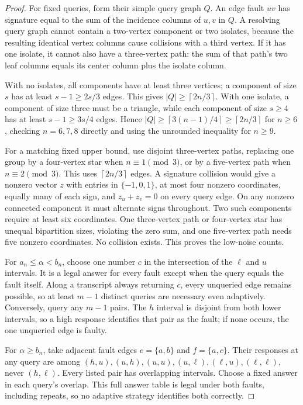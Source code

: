 \documentclass[11pt,letterpaper]{article}
\newcommand{\ceil}[1]{\left\lceil #1\right\rceil}
\begin{document}
\begin{proof}
For fixed queries, form their simple query graph $Q$. An edge fault $uv$ has signature equal to the sum of the incidence columns of $u,v$ in $Q$. A resolving query graph cannot contain a two-vertex component or two isolates, because the resulting identical vertex columns cause collisions with a third vertex. If it has one isolate, it cannot also have a three-vertex path: the sum of that path's two leaf columns equals its center column plus the isolate column.

With no isolates, all components have at least three vertices; a component of size $s$ has at least $s-1\ge2s/3$ edges. This gives $|Q|\ge\ceil{2n/3}$. With one isolate, a component of size three must be a triangle, while each component of size $s\ge4$ has at least $s-1\ge3s/4$ edges. Hence $|Q|\ge\ceil{3(n-1)/4}\ge\ceil{2n/3}$ for $n\ge6$, checking $n=6,7,8$ directly and using the unrounded inequality for $n\ge9$.

For a matching fixed upper bound, use disjoint three-vertex paths, replacing one group by a four-vertex star when $n\equiv1\pmod3$, or by a five-vertex path when $n\equiv2\pmod3$. This uses $\ceil{2n/3}$ edges. A signature collision would give a nonzero vector $z$ with entries in $\{-1,0,1\}$, at most four nonzero coordinates, equally many of each sign, and $z_u+z_v=0$ on every query edge. On any nonzero connected component it must alternate signs throughout. Two such components require at least six coordinates. One three-vertex path or four-vertex star has unequal bipartition sizes, violating the zero sum, and one five-vertex path needs five nonzero coordinates. No collision exists. This proves the low-noise counts.

For $a_n\le\alpha<b_n$, choose one number $c$ in the intersection of the $\ell$ and $u$ intervals. It is a legal answer for every fault except when the query equals the fault itself. Along a transcript always returning $c$, every unqueried edge remains possible, so at least $m-1$ distinct queries are necessary even adaptively. Conversely, query any $m-1$ pairs. The $h$ interval is disjoint from both lower intervals, so a high response identifies that pair as the fault; if none occurs, the one unqueried edge is faulty.

For $\alpha\ge b_n$, take adjacent fault edges $e=\{a,b\}$ and $f=\{a,c\}$. Their responses at any query are among $(h,u),(u,h),(u,u),(u,\ell),(\ell,u),(\ell,\ell)$, never $(h,\ell)$. Every listed pair has overlapping intervals. Choose a fixed answer in each query's overlap. This full answer table is legal under both faults, including repeats, so no adaptive strategy identifies both correctly.
\end{proof}
\end{document}
